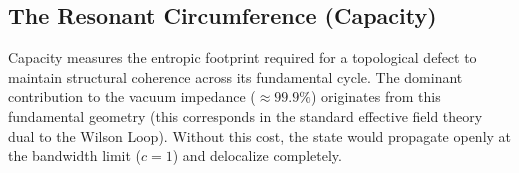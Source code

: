%
\subsection{The Resonant Circumference (Capacity)}
\label{subsec:alpha_cap}
Capacity measures the entropic footprint required for a topological defect to maintain structural coherence across its fundamental cycle. The dominant contribution to the vacuum impedance ($\approx 99.9\%$) originates from this fundamental geometry (this corresponds in the standard effective field theory dual to the Wilson Loop). Without this cost, the state would propagate openly at the bandwidth limit ($c=1$) and delocalize completely.

